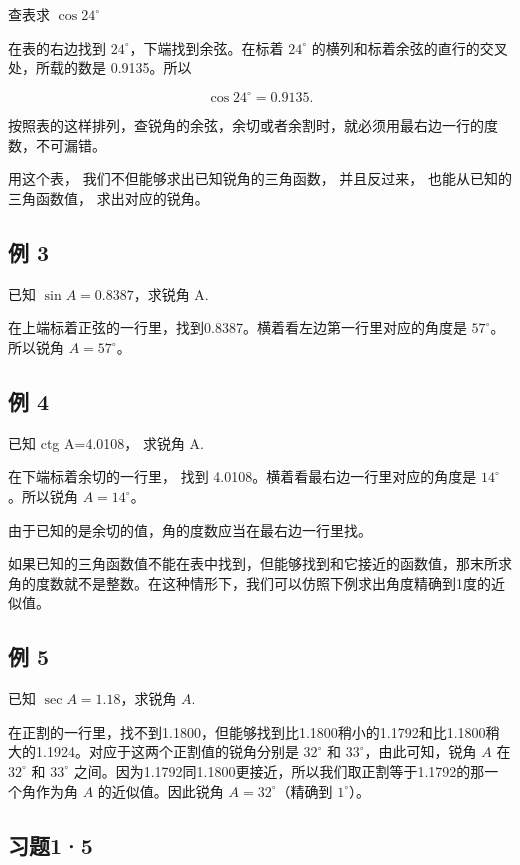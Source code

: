 查表求 \(\cos 24^{\circ}\)

 在表的右边找到 \(24^{\circ}\)，下端找到余弦。在标着
\(24^{\circ}\) 的横列和标着余弦的直行的交叉处，所载的数是 0.9135。所以

\[
\cos 24 ^{\circ} = 0.9135.
\]

按照表的这样排列，查锐角的余弦，余切或者余割时，就必须用最右边一行的度数，不可漏错。

用这个表， 我们不但能够求出已知锐角的三角函数， 并且反过来，
也能从已知的三角函数值， 求出对应的锐角。

\subsection{例 3}

已知 \(\sin A=0.8387\)，求锐角 A.

在上端标着正弦的一行里，找到0.8387。横着看左边第一行里对应的角度是
\(57^{\circ}\)。所以锐角 \(A=57^{\circ}\)。

\subsection{例 4}

已知 ctg A=4.0108， 求锐角 A.

 在下端标着余切的一行里， 找到
4.0108。横着看最右边一行里对应的角度是 \(14^{\circ}\)。所以锐角
\(A = 14^{\circ}\)。

 由于已知的是余切的值，角的度数应当在最右边一行里找。

如果已知的三角函数值不能在表中找到，但能够找到和它接近的函数值，那末所求角的度数就不是整数。在这种情形下，我们可以仿照下例求出角度精确到1度的近似值。

\subsection{例 5}

已知 \(\sec A = 1.18\)，求锐角 \(A\).

在正割的一行里，找不到1.1800，但能够找到比1.1800稍小的1.1792和比1.1800稍大的1.1924。对应于这两个正割值的锐角分别是
\(32^{\circ}\) 和 \(33^{\circ}\)，由此可知，锐角 \(A\) 在 \(32^{\circ}\)
和 \(33^{\circ}\)
之间。因为1.1792同1.1800更接近，所以我们取正割等于1.1792的那一个角作为角
\(A\) 的近似值。因此锐角 \(A = 32^{\circ}\)（精确到 \(1^{\circ}\)）。

\subsection{习题1·5}

